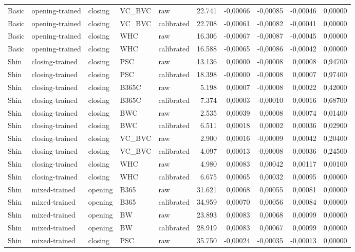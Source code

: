 {\begin{longtable}{@{}lllllrrrrr@{}}
Basic & opening-trained & closing & VC\_BVC & raw & 22.741 & -0,00066 & -0,00085 & -0,00046 & 0,00000 \\
Basic & opening-trained & closing & VC\_BVC & calibrated & 22.708 & -0,00061 & -0,00082 & -0,00041 & 0,00000 \\
Basic & opening-trained & closing & WHC & raw & 16.306 & -0,00067 & -0,00087 & -0,00045 & 0,00000 \\
Basic & opening-trained & closing & WHC & calibrated & 16.588 & -0,00065 & -0,00086 & -0,00042 & 0,00000 \\
Shin & closing-trained & closing & PSC & raw & 13.136 & 0,00000 & -0,00008 & 0,00008 & 0,94700 \\
Shin & closing-trained & closing & PSC & calibrated & 18.398 & -0,00000 & -0,00008 & 0,00007 & 0,97400 \\
Shin & closing-trained & closing & B365C & raw & 5.198 & 0,00007 & -0,00008 & 0,00022 & 0,42000 \\
Shin & closing-trained & closing & B365C & calibrated & 7.374 & 0,00003 & -0,00010 & 0,00016 & 0,68700 \\
Shin & closing-trained & closing & BWC & raw & 2.535 & 0,00039 & 0,00008 & 0,00074 & 0,01400 \\
Shin & closing-trained & closing & BWC & calibrated & 6.511 & 0,00018 & 0,00002 & 0,00036 & 0,02900 \\
Shin & closing-trained & closing & VC\_BVC & raw & 2.900 & 0,00016 & -0,00009 & 0,00042 & 0,20400 \\
Shin & closing-trained & closing & VC\_BVC & calibrated & 4.097 & 0,00013 & -0,00008 & 0,00036 & 0,24500 \\
Shin & closing-trained & closing & WHC & raw & 4.980 & 0,00083 & 0,00042 & 0,00117 & 0,00100 \\
Shin & closing-trained & closing & WHC & calibrated & 6.675 & 0,00065 & 0,00032 & 0,00095 & 0,00000 \\
Shin & mixed-trained & opening & B365 & raw & 31.621 & 0,00068 & 0,00055 & 0,00081 & 0,00000 \\
Shin & mixed-trained & opening & B365 & calibrated & 34.959 & 0,00070 & 0,00056 & 0,00084 & 0,00000 \\
Shin & mixed-trained & opening & BW & raw & 23.893 & 0,00083 & 0,00068 & 0,00099 & 0,00000 \\
Shin & mixed-trained & opening & BW & calibrated & 28.919 & 0,00083 & 0,00067 & 0,00099 & 0,00000 \\
Shin & mixed-trained & closing & PSC & raw & 35.750 & -0,00024 & -0,00035 & -0,00013 & 0,00000 \\

\end{longtable}}
